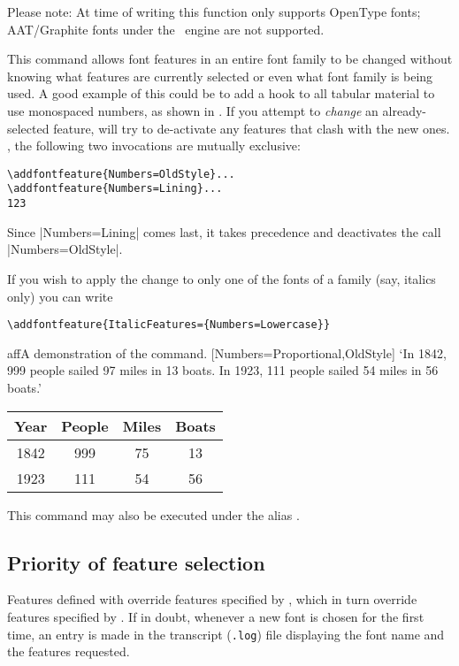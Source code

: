 \documentclass[a4paper]{l3doc}
\begin{document}
Please note: At time of writing this function only supports OpenType fonts; AAT/Graphite fonts under the \XeTeX\ engine are not supported.



This command allows font features in an entire font family to
be changed without knowing what features are currently selected or even what
font family is being used. A good example of this could be to add a hook to all
tabular material to use monospaced numbers, as shown in .
If you attempt to \emph{change} an already-selected feature,  will try to de-activate any features that clash with the new ones.
\Eg, the following two invocations are mutually exclusive:
\begin{Verbatim}
\addfontfeature{Numbers=OldStyle}...
\addfontfeature{Numbers=Lining}...
123
\end{Verbatim}
Since |Numbers=Lining| comes last, it takes precedence and deactivates the call |Numbers=OldStyle|.

If you wish to apply the change to only one of the fonts of a family (say, italics only)
you can write
\begin{Verbatim}
\addfontfeature{ItalicFeatures={Numbers=Lowercase}}
\end{Verbatim}


\begin{Lexample}{aff}{A demonstration of the  command.}
           [Numbers={Proportional,OldStyle}]
  `In 1842, 999 people sailed 97 miles in
   13 boats. In 1923, 111 people sailed 54
   miles in 56 boats.'            \bigskip

  {
  \begin{tabular}{@{} cccc @{}}
            Year & People & Miles & Boats \\
    \hline  1842 &  999   &  75   &  13   \\
            1923 &  111   &  54   &  56
  \end{tabular}}
\end{Lexample}

\DescribeMacro{\addfontfeature}
This command may also be executed under the alias \cmd{\addfontfeature}.


\subsection{Priority of feature selection}
Features defined with  override features
specified by , which in turn override features
specified by .  If in doubt, whenever a
new font is chosen for the first time, an entry is made in the
transcript (\texttt{.log}) file displaying the font name and the
features requested.
\end{document}
